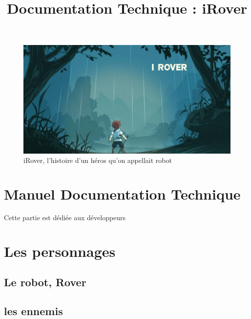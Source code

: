 \documentclass[a4paper 12pts]{article}
\title{Documentation Technique : iRover}
\author{}
\begin{document}
\maketitle


\begin{figure}[h]
   \includegraphics[width=350pt]{Illustration/proj_irover.jpg}
	\caption{iRover, l'histoire d'un héros qu'on appellait robot}
\end{figure}



\newpage


\renewcommand{\contentsname}{Sommaire} 
\tableofcontents

\newpage





\section{Manuel Documentation Technique}


\vspace{2cm}

Cette partie est dédiée aux développeurs


\section{Les personnages}

\subsection{Le robot, Rover}

\subsection{les ennemis}
\end{document}
